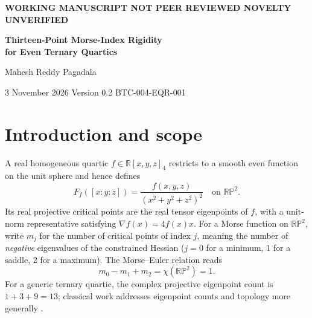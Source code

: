 \documentclass[10pt,a4paper]{article}
\theoremstyle{plain}
\theoremstyle{remark}
\newcommand{\RP}{\mathbb{RP}}
\begin{document}
\begin{center}
{\small\bfseries\color{muted} WORKING MANUSCRIPT \textemdash{} NOT PEER REVIEWED \textemdash{} NOVELTY UNVERIFIED}\par\vspace{8pt}
{\LARGE\bfseries\color{ink} Thirteen-Point Morse-Index Rigidity\\[4pt] for Even Ternary Quartics}\par\vspace{12pt}
{\large Mahesh Reddy Pagadala}\par\vspace{4pt}
{\small 3 November 2026 \quad\textbar\quad Version 0.2 \quad\textbar\quad BTC-004-EQR-001}\par
\end{center}
\vspace{4pt}
\begin{abstract}
Let $f$ be a real homogeneous ternary quartic containing only monomials even in each coordinate, with arbitrary coefficients. We prove that, if its normalized function on $\RP^2$ is Morse and has thirteen distinct real critical points, then its Morse-index counts $(m_0,m_1,m_2)$ are necessarily $(4,6,3)$ or $(3,6,4)$; both occur. The proof passes to squared coordinates on the standard two-simplex, where the function becomes quadratic. A determinant identity relates the edge curvature, transverse derivative and interior Hessian and yields an exhaustive index classification. The conclusion excludes four other arithmetically admissible thirteen-point triples \emph{within this even-power family}; it makes no assertion of impossibility for general ternary quartics. This manuscript is an internal, AI-assisted research draft. Independent human review and comprehensive prior-art verification remain outstanding.
\end{abstract}

\section{Introduction and scope}
A real homogeneous quartic $f\in\mathbb R[x,y,z]_4$ restricts to a smooth even function on the unit sphere and hence defines
\begin{equation}\label{eq:F}
 F_f([x:y:z])=\frac{f(x,y,z)}{(x^2+y^2+z^2)^2}\quad\text{on }\RP^2.
\end{equation}
Its real projective critical points are the real tensor eigenpoints of $f$, with a unit-norm representative satisfying $\nabla f(x)=4f(x)x$. For a Morse function on $\RP^2$, write $m_j$ for the number of critical points of index $j$, meaning the number of \emph{negative} eigenvalues of the constrained Hessian ($j=0$ for a minimum, $1$ for a saddle, $2$ for a maximum). The Morse--Euler relation reads
\begin{equation}\label{eq:euler}
 m_0-m_1+m_2=\chi(\RP^2)=1.
\end{equation}
For a generic ternary quartic, the complex projective eigenpoint count is $1+3+9=13$; classical work addresses eigenpoint counts and topology more generally \cite{cartwright2013,abo2017,maccioni2018,bassotu2020,kozhasov2018}.
\end{document}

